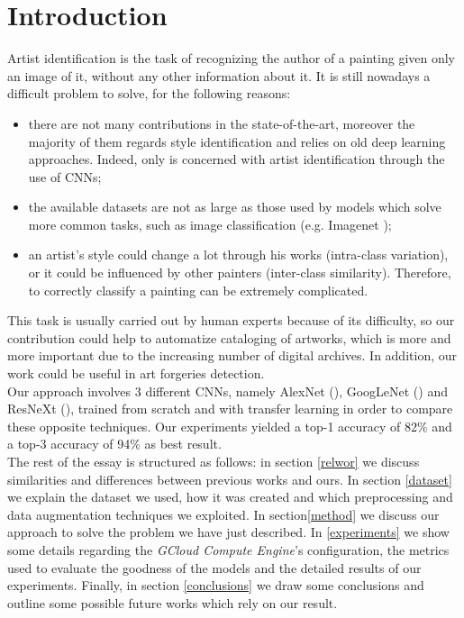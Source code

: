 \documentclass{article}
\begin{document}
\section{Introduction}
Artist identification is the task of recognizing the author of a painting given only an image of it, without any other information about it. It is still nowadays a difficult problem to solve, for the following reasons:
\begin{itemize}
	\item there are not many contributions in the state-of-the-art, moreover the majority of them regards style identification and relies on old deep learning approaches. Indeed, only \cite{ArtistIdCNN406} is concerned with artist identification through the use of CNNs;
	\item the available datasets are not as large as those used by models which solve more common tasks, such as image classification (e.g. Imagenet \cite{imagenet});
	\item an artist's style could change a lot through his works (intra-class variation), or it could be influenced by other painters (inter-class similarity). Therefore, to correctly classify a painting can be extremely complicated. 
\end{itemize}
This task is usually carried out by human experts because of its difficulty, so our contribution could help to automatize cataloging of artworks, which is more and more important due to the increasing number of  digital archives. In addition, our work could be useful in art forgeries detection.\\
Our approach involves 3 different CNNs, namely AlexNet (\cite{alexnet}), GoogLeNet (\cite{googlenet}) and ResNeXt (\cite{resneXt}), trained from scratch and with transfer learning in order to compare these opposite techniques. Our experiments yielded a top-1 accuracy of 82\%  and a top-3 accuracy of 94\% as best result.\\


The rest of the essay is structured as follows: in section \ref{relwor} we discuss  similarities and differences between previous works and ours. In section \ref{dataset} we explain the dataset we used, how it was created and which preprocessing and data augmentation techniques we exploited. In section\ref{method}
we discuss our approach to solve the problem we have just described. In \ref{experiments} we show some details regarding the \textit{GCloud Compute Engine}'s configuration, the metrics used to evaluate the goodness of the models and the detailed results of our experiments. Finally, in section \ref{conclusions} we draw some conclusions and outline some possible future works which rely on our result.
\end{document}
